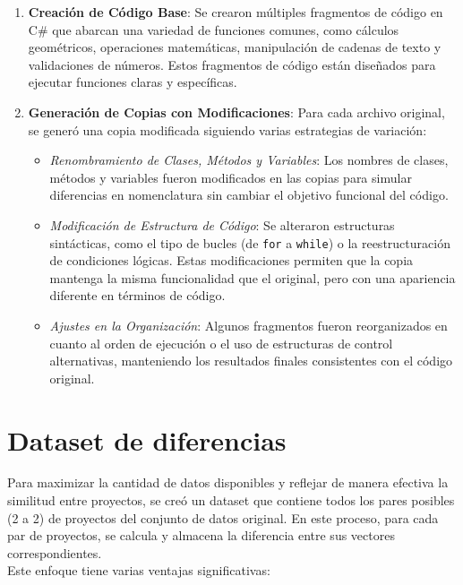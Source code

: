 \begin{enumerate}
    \item \textbf{Creación de Código Base}: Se crearon múltiples fragmentos de código en C\# que abarcan una variedad de funciones comunes, como cálculos geométricos, operaciones matemáticas, manipulación de cadenas de texto y validaciones de números. Estos fragmentos de código están diseñados para ejecutar funciones claras y específicas. 

    \item \textbf{Generación de Copias con Modificaciones}: Para cada archivo original, se generó una copia modificada siguiendo varias estrategias de variación:
    \begin{itemize}
        \item \textit{Renombramiento de Clases, Métodos y Variables}: Los nombres de clases, métodos y variables fueron modificados en las copias para simular diferencias en nomenclatura sin cambiar el objetivo funcional del código.
        \item \textit{Modificación de Estructura de Código}: Se alteraron estructuras sintácticas, como el tipo de bucles (de \texttt{for} a \texttt{while}) o la reestructuración de condiciones lógicas. Estas modificaciones permiten que la copia mantenga la misma funcionalidad que el original, pero con una apariencia diferente en términos de código.
        \item \textit{Ajustes en la Organización}: Algunos fragmentos fueron reorganizados en cuanto al orden de ejecución o el uso de estructuras de control alternativas, manteniendo los resultados finales consistentes con el código original.
    \end{itemize}
\end{enumerate}

\section{Dataset de diferencias}

Para maximizar la cantidad de datos disponibles y reflejar de manera efectiva la similitud entre proyectos, se creó un dataset que contiene todos los pares posibles (2 a 2) de proyectos del conjunto de datos original. En este proceso, para cada par de proyectos, se calcula y almacena la diferencia entre sus vectores correspondientes.\\

Este enfoque tiene varias ventajas significativas:

